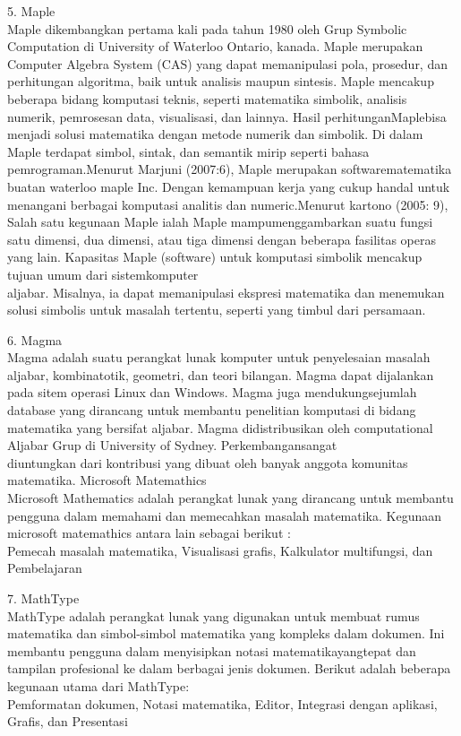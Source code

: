\documentclass[a4paper,10pt]{article}
\begin{document}
\begin{eulernotebook}
\begin{eulercomment}
5. Maple\\
Maple dikembangkan pertama kali pada tahun 1980 oleh Grup Symbolic Computation
di University of Waterloo Ontario, kanada. Maple merupakan Computer Algebra
System (CAS) yang dapat memanipulasi pola, prosedur, dan perhitungan
algoritma, baik untuk analisis maupun sintesis. Maple mencakup beberapa bidang
komputasi teknis, seperti matematika simbolik, analisis numerik, pemrosesan
data, visualisasi, dan lainnya. Hasil perhitunganMaplebisa menjadi solusi
matematika dengan metode numerik dan simbolik. Di dalam Maple terdapat simbol,
sintak, dan semantik mirip seperti bahasa pemrograman.Menurut Marjuni
(2007:6), Maple merupakan softwarematematika buatan waterloo maple Inc. Dengan
kemampuan kerja yang cukup handal untuk menangani berbagai komputasi analitis
dan numeric.Menurut kartono (2005: 9), Salah satu kegunaan Maple ialah Maple
mampumenggambarkan suatu fungsi satu dimensi, dua dimensi, atau tiga dimensi
dengan beberapa fasilitas operas yang lain. Kapasitas Maple (software) untuk
komputasi simbolik mencakup tujuan umum dari sistemkomputer\\
aljabar. Misalnya, ia dapat memanipulasi ekspresi matematika dan menemukan
solusi simbolis untuk masalah tertentu, seperti yang timbul dari persamaan.

6. Magma\\
Magma adalah suatu perangkat lunak komputer untuk penyelesaian masalah
aljabar, kombinatotik, geometri, dan teori bilangan. Magma dapat dijalankan
pada sitem operasi Linux dan Windows. Magma juga mendukungsejumlah database
yang dirancang untuk membantu penelitian komputasi di bidang matematika yang
bersifat aljabar. Magma didistribusikan oleh computational Aljabar Grup di
University of Sydney. Perkembangansangat\\
diuntungkan dari kontribusi yang dibuat oleh banyak anggota komunitas
matematika. Microsoft Matemathics\\
Microsoft Mathematics adalah perangkat lunak yang dirancang untuk membantu
pengguna dalam memahami dan memecahkan masalah matematika. Kegunaan microsoft
matemathics antara lain sebagai berikut :\\
Pemecah masalah matematika, Visualisasi grafis, Kalkulator multifungsi, dan
Pembelajaran

7. MathType\\
MathType adalah perangkat lunak yang digunakan untuk membuat rumus matematika
dan simbol-simbol matematika yang kompleks dalam dokumen. Ini membantu
pengguna dalam menyisipkan notasi matematikayangtepat dan tampilan profesional
ke dalam berbagai jenis dokumen. Berikut adalah beberapa kegunaan utama dari
MathType:\\
Pemformatan dokumen, Notasi matematika, Editor, Integrasi dengan aplikasi,
Grafis, dan Presentasi


\end{eulercomment}
\end{eulernotebook}
\end{document}
